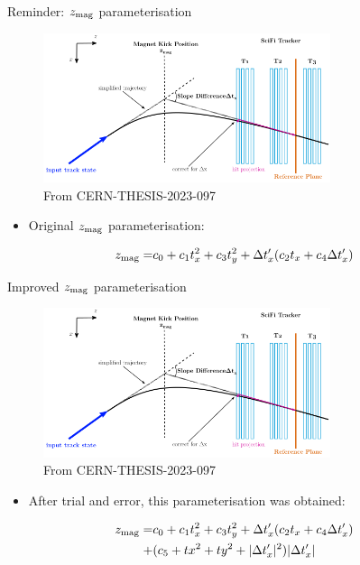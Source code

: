 \documentclass[xcolor={dvipsnames}]{beamer}
\begin{document}
\begin{frame}{Reminder: $z_{\rm mag}$ parameterisation}
  \vspace{0.0cm}
  \begin{figure}[htb]
    \centering
    \includegraphics[width=0.75\textwidth]{Plots/MagnetKinkPosition.png}
    \caption*{\small From CERN-THESIS-2023-097}
  \end{figure}

  \begin{itemize}
    \item{Original $z_{\rm mag}$ parameterisation:}
  \end{itemize}
  \begin{align*}
    z_{\rm mag} =& c_0 + c_1t_x^2 + c_3t_y^2 + \Delta t_x^\prime(c_2t_x + c_4\Delta t_x^\prime) \\
  \end{align*}
\end{frame}

\begin{frame}{Improved $z_{\rm mag}$ parameterisation}
  \vspace{0.0cm}
  \begin{figure}[htb]
    \centering
    \includegraphics[width=0.75\textwidth]{Plots/MagnetKinkPosition.png}
    \caption*{\small From CERN-THESIS-2023-097}
  \end{figure}
  \begin{itemize}
    \item{After trial and error, this parameterisation was obtained:}
  \end{itemize}
  \begin{align*}
    z_{\rm mag} =& c_0 + c_1t_x^2 + c_3t_y^2 + \Delta t_x^\prime(c_2t_x + c_4\Delta t_x^\prime) \\
    +& (c_5 + tx^2 + ty^2 + \lvert\Delta t_x^\prime\rvert^2)\lvert\Delta t_x^\prime\rvert
  \end{align*}
\end{frame}
\end{document}
